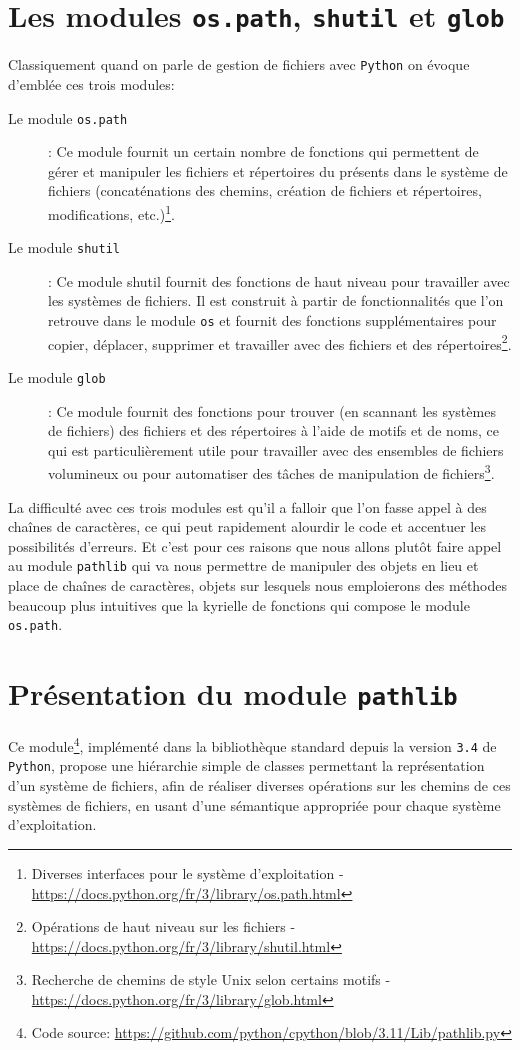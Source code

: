 \documentclass[a4paper,11pt]{book}
\begin{document}
\section{Les modules \texttt{os.path}, \texttt{shutil} et \texttt{glob}}
Classiquement quand on parle de gestion de fichiers avec \texttt{Python} on évoque d'emblée ces trois modules:
\begin{description}
	\item[Le module \texttt{os.path}]: Ce module fournit un certain nombre de fonctions qui permettent de gérer et manipuler les fichiers et répertoires du présents dans le système de fichiers (concaténations des chemins, création de fichiers et répertoires, modifications, etc.)\footnote{Diverses interfaces pour le système d'exploitation - \url{https://docs.python.org/fr/3/library/os.path.html}}.
	\item[Le module \texttt{shutil}]: Ce module shutil fournit des fonctions de haut niveau pour travailler avec les systèmes de fichiers. Il est construit à partir de fonctionnalités que l'on retrouve dans le module \texttt{os} et fournit des fonctions supplémentaires pour copier, déplacer, supprimer et travailler avec des fichiers et des répertoires\footnote{Opérations de haut niveau sur les fichiers - \url{https://docs.python.org/fr/3/library/shutil.html}}.
	\item[Le module \texttt{glob}]: Ce module fournit des fonctions pour trouver (en scannant les systèmes de fichiers) des fichiers et des répertoires à l'aide de  motifs et de noms, ce qui est particulièrement utile pour travailler avec des ensembles de fichiers volumineux ou pour automatiser des tâches de manipulation de fichiers\footnote{Recherche de chemins de style Unix selon certains motifs - \url{https://docs.python.org/fr/3/library/glob.html}}.
\end{description}
\medskip

La difficulté avec ces trois modules est qu'il a falloir que l'on fasse appel à des chaînes de caractères, ce qui peut rapidement alourdir le code et accentuer les possibilités d'erreurs. Et c'est pour ces raisons que nous allons plutôt faire appel au module \texttt{pathlib} qui va nous permettre de manipuler des objets en lieu et place de chaînes de caractères, objets sur lesquels nous emploierons des méthodes beaucoup plus intuitives que la kyrielle de fonctions qui compose le module \texttt{os.path}. 
\medskip

\section{Présentation du module \texttt{pathlib}}
Ce module\footnote{Code source: \url{https://github.com/python/cpython/blob/3.11/Lib/pathlib.py}}, implémenté dans la bibliothèque standard depuis la version \texttt{3.4} de \texttt{Python}, propose une hiérarchie simple de classes permettant la représentation d'un système de fichiers, afin de réaliser diverses opérations sur les chemins de ces systèmes de fichiers, en usant d'une sémantique appropriée pour chaque système d'exploitation.
\medskip
\end{document}
